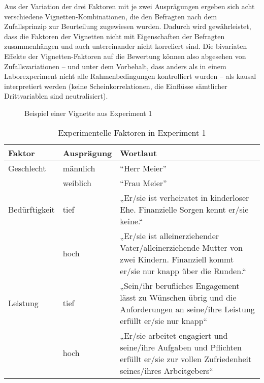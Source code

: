 \documentclass[a4paper,12pt]{article}
\begin{document}
Aus der Variation der drei Faktoren mit je zwei Ausprägungen ergeben sich acht
verschiedene Vignetten-Kombinationen, die den Befragten nach dem Zufallsprinzip
zur Beurteilung zugewiesen wurden. Dadurch wird gewährleistet, dass die
Faktoren der Vignetten nicht mit Eigenschaften der Befragten zusammenhängen und
auch untereinander nicht korreliert sind. Die bivariaten Effekte der
Vignetten-Faktoren auf die Bewertung können also abgesehen von
Zufallsvariationen – und unter dem Vorbehalt, dass anders als in einem
Laborexperiment nicht alle Rahmenbedingungen kontrolliert wurden – als
kausal interpretiert werden (keine Scheinkorrelationen, die Einflüsse
sämtlicher Drittvariablen sind neutralisiert).


\begin{figure}\centering
    \caption{Beispiel einer Vignette aus Experiment 1}\label{fig-1}
\end{figure}


\begin{table}
    \small
    \caption{Experimentelle Faktoren in Experiment 1}\label{tab-ex1-faktoren}
    \begin{tabularx}{\textwidth}{@{}llX@{}}
        \toprule
        Faktor          & Ausprägung & Wortlaut       \\\midrule
        Geschlecht      & männlich     & “Herr Meier”   \\
                        & weiblich     & “Frau Meier”   \\
        \addlinespace
        Bedürftigkeit   & tief         & „Er/sie ist verheiratet in kinderloser Ehe. Finanzielle Sorgen kennt er/sie keine.“ \\
                        & hoch         & „Er/sie ist alleinerziehender Vater/alleinerziehende Mutter von zwei Kindern. Finanziell kommt er/sie nur knapp über die Runden.“ \\
        \addlinespace
        Leistung        & tief         & „Sein/ihr berufliches Engagement lässt zu Wünschen übrig und die Anforderungen an seine/ihre Leistung erfüllt er/sie nur knapp“   \\
                        & hoch         & „Er/sie arbeitet engagiert und seine/ihre Aufgaben und Pflichten erfüllt er/sie zur vollen Zufriedenheit seines/ihres Arbeitgebers“  \\
        \bottomrule
    \end{tabularx}
\end{table}
\end{document}
